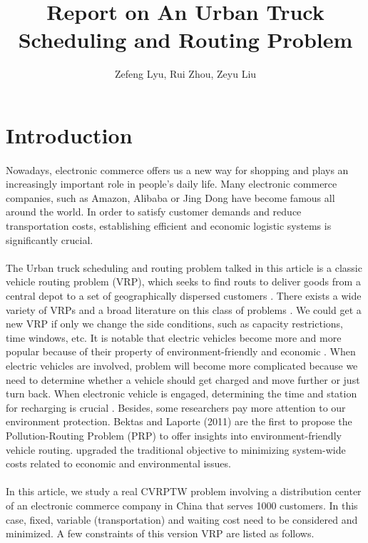 \documentclass[12pt]{article}
\title{Report on An Urban Truck Scheduling and Routing Problem}
\author{Zefeng Lyu, Rui Zhou, Zeyu Liu}
\date{}
\numberwithin{equation}{section}
\begin{document}
\maketitle

\section{Introduction}

	\paragraph{}Nowadays, electronic commerce offers us a new way for shopping and plays an increasingly important role in people’s daily life. Many electronic commerce companies, such as Amazon, Alibaba or Jing Dong have become famous all around the world. In order to satisfy customer demands and reduce transportation costs, establishing efficient and economic logistic systems is significantly crucial. 
	
	\paragraph{}The Urban truck scheduling and routing problem talked in this article is a classic vehicle routing problem (VRP), which seeks to find routs to deliver goods from a central depot to a set of geographically dispersed customers \parencite{Coelho2016}. There exists a wide variety of VRPs and a broad literature on this class of problems \parencite{Laporte1992}. We could get a new VRP if only we change the side conditions, such as capacity restrictions, time windows, etc. It is notable that electric vehicles become more and more popular because of their property of environment-friendly and economic \parencite{Hiermann2016}. When electric vehicles are involved, problem will become more complicated because we need to determine whether a vehicle should get charged and move further or just turn back. When electronic vehicle is engaged, determining the time and station for recharging is crucial \parencite{Zhang2018}. Besides, some researchers pay more attention to our environment protection. Bektas and Laporte (2011) are the first to propose the Pollution-Routing Problem (PRP) to offer insights into environment-friendly vehicle routing. \parencite{Lin2014} upgraded the traditional objective to minimizing system-wide costs related to economic and environmental issues.
	
	\paragraph{}In this article, we study a real CVRPTW problem involving a distribution center of an electronic commerce company in China that serves 1000 customers. In this case, fixed, variable (transportation) and waiting cost need to be considered and minimized. A few constraints of this version VRP are listed as follows. 
	
\end{document}
